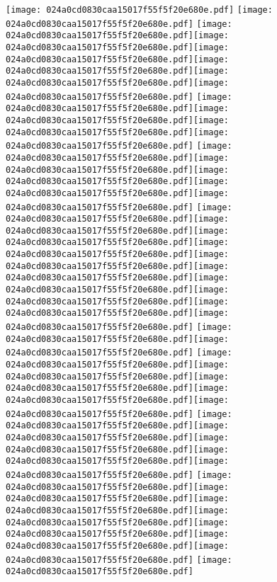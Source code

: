 \documentclass{article}
\newcommand{\origpg}[2]{\texttt{[image: 024a0cd0830caa15017f55f5f20e680e.pdf]}}
\begin{document}
{\vspace{19.754pt}\hspace{36.161pt} 

\vspace{21.199pt}\hspace{18.094pt}\origpg4{103.4pt 478.09pt 110.82pt 494.23pt}  \origpg4{125.56pt 478.09pt 136.32pt 494.23pt} \origpg4{142.88pt 478.09pt 150.72pt 494.23pt}\hspace{-0.371pt}\origpg4{150.35pt 478.09pt 157.52pt 494.23pt}\origpg4{157.57pt 478.09pt 168.72pt 494.23pt}\origpg4{168.65pt 478.09pt 176.87pt 494.23pt}\origpg4{176.87pt 478.09pt 184.94pt 494.23pt}\hspace{-0.387pt}\origpg4{184.55pt 478.09pt 194.77pt 494.23pt} \origpg4{201.16pt 478.09pt 209.23pt 494.23pt}\hspace{-0.355pt}\origpg4{208.88pt 478.09pt 215.25pt 494.23pt}\hspace{-0.113pt}\origpg4{215.14pt 478.09pt 223.19pt 494.23pt}\hspace{0.113pt}\origpg4{223.3pt 478.09pt 230.47pt 494.23pt} \origpg4{236.78pt 478.09pt 247pt 494.23pt}\hspace{0.129pt}\origpg4{247.13pt 478.09pt 255.2pt 494.23pt}\hspace{-0.597pt}\origpg4{254.6pt 478.09pt 265.75pt 494.23pt}\origpg4{265.69pt 478.09pt 272.86pt 494.23pt}\hspace{-0.178pt}\origpg4{272.68pt 478.09pt 279.73pt 494.23pt} \origpg4{286.16pt 478.09pt 294.79pt 494.23pt}\origpg4{294.79pt 478.09pt 301.96pt 494.23pt}\origpg4{302.04pt 478.09pt 310.11pt 494.23pt}\hspace{-0.839pt}\origpg4{309.27pt 478.09pt 317.34pt 494.23pt}\hspace{-0.597pt}\origpg4{316.74pt 478.09pt 324.96pt 494.23pt}\origpg4{324.96pt 478.09pt 333.59pt 494.23pt}\origpg4{333.59pt 478.09pt 340.64pt 494.23pt}\origpg4{340.6pt 478.09pt 347.96pt 494.23pt}\origpg4{348.05pt 478.09pt 355.22pt 494.23pt}\origpg4{355.27pt 478.09pt 362.69pt 494.23pt} \origpg4{369.23pt 478.09pt 377.86pt 494.23pt}\origpg4{377.86pt 478.09pt 385.03pt 494.23pt} \origpg4{391.37pt 478.09pt 399.59pt 494.23pt}\origpg4{399.59pt 478.09pt 407.66pt 494.23pt}\hspace{-0.387pt}\origpg4{407.27pt 478.09pt 415.33pt 494.23pt}\hspace{0.113pt}\origpg4{415.44pt 478.09pt 422.61pt 494.23pt}\hspace{-0.178pt}\origpg4{422.43pt 478.09pt 429.59pt 494.23pt} \origpg4{436.15pt 478.09pt 444.22pt 494.23pt}\hspace{-0.597pt}\origpg4{443.62pt 478.09pt 451.84pt 494.23pt}\origpg4{451.84pt 478.09pt 460.47pt 494.23pt}\origpg4{460.47pt 478.09pt 468.54pt 494.23pt}\hspace{-0.113pt}\origpg4{468.43pt 478.09pt 477.06pt 494.23pt} \origpg4{483.58pt 478.09pt 491.7pt 494.23pt}\origpg4{491.75pt 478.09pt 498.92pt 494.23pt}\origpg4{498.96pt 478.09pt 506.13pt 494.23pt}\origpg4{506.18pt 478.09pt 513.23pt 494.23pt}\origpg4{513.17pt 478.09pt 521.8pt 494.23pt}\origpg4{521.8pt 478.09pt 530.44pt 494.23pt}\hspace{-0.161pt}\origpg4{530.28pt 478.09pt 541.12pt 494.23pt} \origpg4{547.61pt 478.09pt 554.78pt 494.23pt} 

}
\end{document}
